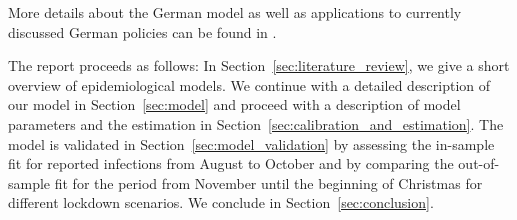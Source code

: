 More details about the German model as well as applications to currently discussed
German policies can be found in \citet{Dorn2020a, Gabler2020, Gabler2021}.

The report proceeds as follows: In Section~\ref{sec:literature_review}, we give a
short overview of epidemiological models.
We continue with a detailed description of our model in Section~\ref{sec:model}
and proceed with a description of model parameters and the estimation in
Section~\ref{sec:calibration_and_estimation}. The model is validated in
Section~\ref{sec:model_validation} by assessing the in-sample fit for reported
infections from August to October and by comparing the out-of-sample fit for the period
from November until the beginning of Christmas for different lockdown scenarios. We
conclude in Section~\ref{sec:conclusion}.
